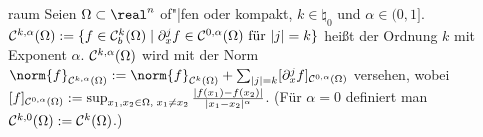 \begin{Def}{raum}
    Seien $\Omega \subset \real^n$ of"|fen oder kompakt,
    $k \in \natural_0$ und $\alpha \in (0, 1]$.\\
    $\mathcal{C}^{k,\alpha}(\Omega) := \{f \in \mathcal{C}^k_b(\Omega) \;|\;
    \partial_x^j f \in \mathcal{C}^{0,\alpha}(\Omega) \text{ für } |j| = k\}$
    heißt  der Ordnung $k$ mit Exponent $\alpha$.
    $\mathcal{C}^{k,\alpha}(\Omega)$ wird mit der Norm
    $\norm{f}_{\C^{k,\alpha}(\Omega)} := \norm{f}_{\C^k(\Omega)} +
    \sum_{|j|=k} [\partial_x^j f]_{\C^{0,\alpha}(\Omega)}$ versehen, wobei
    $[f]_{\mathcal{C}^{0,\alpha}(\Omega)} := \sup_{x_1, x_2 \in \Omega,\; x_1 \not= x_2}
    \frac{|f(x_1) - f(x_2)|}{|x_1 - x_2|^\alpha}$.
    (Für $\alpha = 0$ definiert man $\mathcal{C}^{k,0}(\Omega) := \mathcal{C}^k(\Omega)$.)
\end{Def}

\linie

